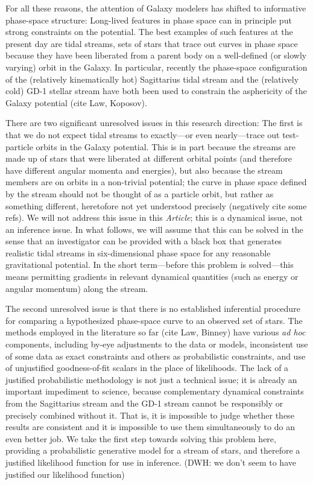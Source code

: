\documentclass[12pt,preprint]{aastex}
\newcounter{address}
\newcommand{\foreign}[1]{\textit{#1}}
\newcommand{\documentname}{\textsl{Article}}
\begin{document}
For all these reasons, the attention of Galaxy modelers has shifted to
informative phase-space structure: Long-lived features in phase space
can in principle put strong constraints on the potential.  The best
examples of such features at the present day are tidal streams, sets
of stars that trace out curves in phase space because they have been
liberated from a parent body on a well-defined (or slowly varying)
orbit in the Galaxy.  In particular, recently the phase-space
configuration of the (relatively kinematically hot) Sagittarius tidal
stream and the (relatively cold) GD-1 stellar stream have both been
used to constrain the asphericity of the Galaxy potential (cite Law,
Koposov).

There are two significant unresolved issues in this research
direction: The first is that we do not expect tidal streams to
exactly---or even nearly---trace out test-particle orbits in the
Galaxy potential.  This is in part because the streams are made up of
stars that were liberated at different orbital points (and therefore
have different angular momenta and energies), but also because the
stream members are on orbits in a non-trivial potential; the curve in
phase space defined by the stream should not be thought of as a
particle orbit, but rather as something different, heretofore not yet
understood precisely (negatively cite some refs).  We will not address
this issue in this \documentname; this is a dynamical issue, not an
inference issue.  In what follows, we will assume that this can be
solved in the sense that an investigator can be provided with a black
box that generates realistic tidal streams in six-dimensional phase
space for any reasonable gravitational potential.  In the short
term---before this problem is solved---this means permitting gradients
in relevant dynamical quantities (such as energy or angular momentum)
along the stream.

The second unresolved issue is that there is no established
inferential procedure for comparing a hypothesized phase-space curve
to an observed set of stars.  The methods employed in the literature
so far (cite Law, Binney) have various \foreign{ad hoc} components,
including by-eye adjustments to the data or models, inconsistent use
of some data as exact constraints and others as probabilistic
constraints, and use of unjustified goodness-of-fit scalars in the
place of likelihoods.  The lack of a justified probabilistic
methodology is not just a technical issue; it is already an important
impediment to science, because complementary dynamical constraints
from the Sagittarius stream and the GD-1 stream cannot be responsibly
or precisely combined without it.  That is, it is impossible to judge
whether these results are consistent and it is impossible to use them
simultaneously to do an even better job.  We take the first step
towards solving this problem here, providing a probabilistic
generative model for a stream of stars, and therefore a justified
likelihood function for use in inference. (DWH: we don't seem to have justified our likelihood function)
\end{document}
